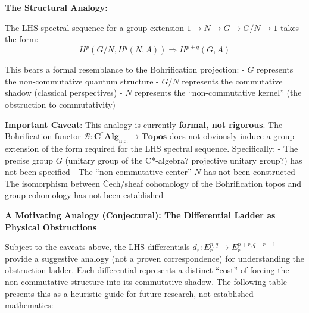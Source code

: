 \documentclass[11pt]{article}
\begin{document}
\textbf{The Structural Analogy:}

The LHS spectral sequence for a group extension \(1 \to N \to G \to G/N \to 1\) takes the form: \[H^p(G/N, H^q(N, A)) \Rightarrow H^{p+q}(G, A)\]

This bears a formal resemblance to the Bohrification projection: - \(G\) represents the non-commutative quantum structure - \(G/N\) represents the commutative shadow (classical perspectives) - \(N\) represents the ``non-commutative kernel'' (the obstruction to commutativity)

\textbf{Important Caveat}: This analogy is currently \textbf{formal, not rigorous}. The Bohrification functor \(\mathcal{B}: \mathbf{C^*Alg}_{\text{n.c.}} \to \mathbf{Topos}\) does not obviously induce a group extension of the form required for the LHS spectral sequence. Specifically: - The precise group \(G\) (unitary group of the C*-algebra? projective unitary group?) has not been specified - The ``non-commutative center'' \(N\) has not been constructed - The isomorphism between Čech/sheaf cohomology of the Bohrification topos and group cohomology has not been established

\textbf{A Motivating Analogy (Conjectural): The Differential Ladder as Physical Obstructions}

Subject to the caveats above, the LHS differentials \(d_r: E_r^{p,q} \to E_r^{p+r, q-r+1}\) provide a suggestive analogy (not a proven correspondence) for understanding the obstruction ladder. Each differential represents a distinct ``cost'' of forcing the non-commutative structure into its commutative shadow. The following table presents this as a heuristic guide for future research, not established mathematics:
\end{document}
